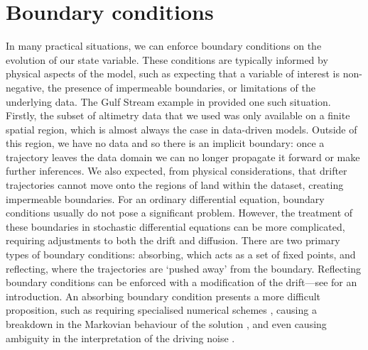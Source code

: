 \section{Boundary conditions}\label{sec:disc_bc}
In many practical situations, we can enforce boundary conditions on the evolution of our state variable.
These conditions are typically informed by physical aspects of the model, such as expecting that a variable of interest is non-negative, the presence of impermeable boundaries, or limitations of the underlying data.
The Gulf Stream example in  provided one such situation.
Firstly, the subset of altimetry data that we used was only available on a finite spatial region, which is almost always the case in data-driven models.
Outside of this region, we have no data and so there is an implicit boundary: once a trajectory leaves the data domain we can no longer propagate it forward or make further inferences.
We also expected, from physical considerations, that drifter trajectories cannot move onto the regions of land within the dataset, creating impermeable boundaries.
For an ordinary differential equation, boundary conditions usually do not pose a significant problem.
However, the treatment of these boundaries in stochastic differential equations can be more complicated, requiring adjustments to both the drift and diffusion.
There are two primary types of boundary conditions: absorbing, which acts as a set of fixed points, and reflecting, where the trajectories are `pushed away' from the boundary.
Reflecting boundary conditions can be enforced with a modification of the drift---see \citet{Pilipenko_2014_IntroductionStochasticDifferential} for an introduction.
An absorbing boundary condition presents a more difficult proposition, such as requiring specialised numerical schemes \citep{Mannella_1999_AbsorbingBoundariesOptimal}, causing a breakdown in the Markovian behaviour of the solution \citep{Munoz_1998_NatureDifferentTypes}, and even causing ambiguity in the interpretation of the driving noise \citep{CorrealesEscudero_2019_ItoVsStratonovich}.


